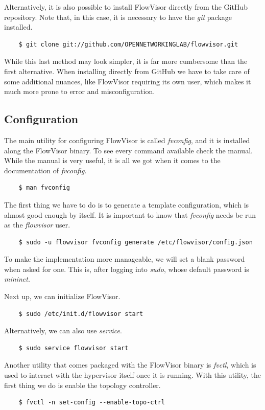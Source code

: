 Alternatively, it is also possible to install FlowVisor directly from the GitHub repository. Note that, in this case, it is necessary to have the \textit{git} package installed.
\begin{lstlisting}
    $ git clone git://github.com/OPENNETWORKINGLAB/flowvisor.git
\end{lstlisting}

While this last method may look simpler, it is far more cumbersome than the first alternative. When installing directly from GitHub we have to take care of some additional nuances, like FlowVisor requiring its own user, which makes it much more prone to error and misconfiguration.

\subsection{Configuration}
The main utility for configuring FlowVisor is called \textit{fvconfig}, and it is installed along the FlowVisor binary. To see every command available check the manual. While the manual is very useful, it is all we got when it comes to the documentation of \textit{fvconfig}. 
 \begin{lstlisting}
    $ man fvconfig
\end{lstlisting}

The first thing we have to do is to generate a template configuration, which is almost good enough by itself. It is important to know that \textit{fvconfig} needs be run as the \textit{flowvisor} user.
 \begin{lstlisting}
    $ sudo -u flowvisor fvconfig generate /etc/flowvisor/config.json
\end{lstlisting}

To make the implementation more manageable, we will set a blank password when asked for one. This is, after logging into \textit{sudo}, whose default password is \textit{mininet}.

Next up, we can initialize FlowVisor.
 \begin{lstlisting}
    $ sudo /etc/init.d/flowvisor start
\end{lstlisting}

Alternatively, we can also use \textit{service}.
 \begin{lstlisting}
    $ sudo service flowvisor start
\end{lstlisting}

Another utility that comes packaged with the FlowVisor binary is \textit{fvctl}, which is used to interact with the hypervisor itself once it is running. With this utility, the first thing we do is enable the topology controller.
 \begin{lstlisting}
    $ fvctl -n set-config --enable-topo-ctrl
\end{lstlisting}

